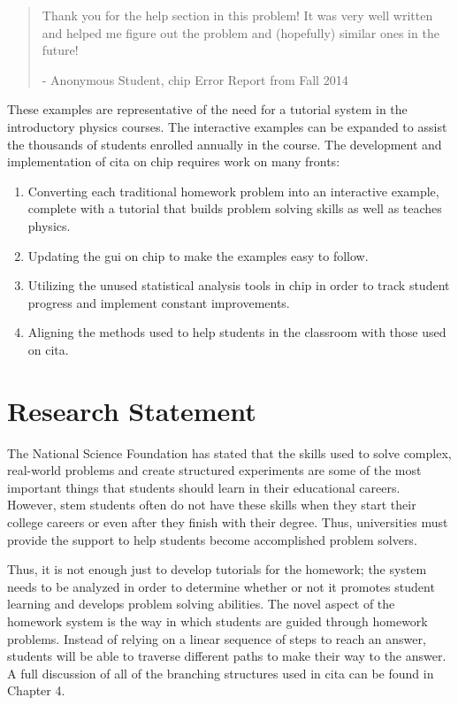 \begin{quote}
Thank you for the help section in this problem! It was very well written and helped me figure out the problem and (hopefully) similar ones in the future!

- Anonymous Student, \gls{chip} Error Report from Fall 2014
\end{quote}

These examples are representative of the need for a tutorial system in the introductory physics courses. The interactive examples can be expanded to assist the thousands of students enrolled annually in the course. The development and implementation of \gls{cita} on \gls{chip} requires work on many fronts:

\begin{enumerate}
\item Converting each traditional homework problem into an interactive example, complete with a tutorial that builds problem solving skills as well as teaches physics.
\item Updating the \gls{gui} on \gls{chip} to make the examples easy to follow.
\item Utilizing the unused statistical analysis tools in \gls{chip} in order to track student progress and implement constant improvements.
\item Aligning the methods used to help students in the classroom with those used on \gls{cita}.
\end{enumerate}

\section{Research Statement}

The National Science Foundation has stated that the skills used to solve complex, real-world problems and create structured experiments are some of the most important things that students should learn in their educational careers\cite{shaping1996}. However, \gls{stem} students often do not have these skills when they start their college careers or even after they finish with their degree. Thus, universities must provide the support to help students become accomplished problem solvers.

Thus, it is not enough just to develop tutorials for the homework; the system needs to be analyzed in order to determine whether or not it promotes student learning and develops problem solving abilities. The novel aspect of the homework system is the way in which students are guided through homework problems. Instead of relying on a linear sequence of steps to reach an answer, students will be able to traverse different paths to make their way to the answer. A full discussion of all of the branching structures used in \gls{cita} can be found in Chapter 4.

